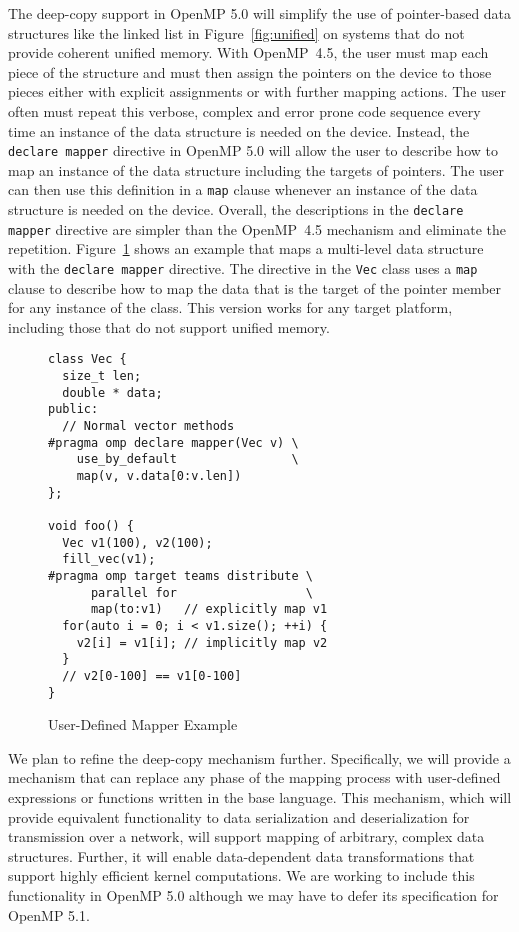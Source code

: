 The deep-copy support in OpenMP 5.0 will simplify the use of pointer-based 
data structures like the linked list in Figure~\ref{fig:unified} on systems 
that do not provide coherent unified memory. With OpenMP~4.5, the user must 
map each piece of the structure and must then assign the pointers on the 
device to those pieces either with explicit assignments or with further 
mapping actions. The user often must repeat this verbose, complex and error 
prone code sequence every time an instance of the data structure is needed 
on the device. Instead, the \texttt{declare mapper} directive in OpenMP 5.0 
will allow the user to describe how to map an instance of the data structure 
including the targets of pointers. The user can then use this definition in 
a \texttt{map} clause whenever an instance of the data structure is needed 
on the device. Overall, the descriptions in the \texttt{declare mapper} 
directive are simpler than the OpenMP~4.5 mechanism and eliminate the 
repetition. Figure~\ref{fig:mapper} shows an example that maps a multi-level 
data structure with the \texttt{declare mapper} directive.  The directive in 
the \texttt{Vec} class uses a \texttt{map} clause to describe how to map the 
data that is the target of the pointer member for any instance of the class.  
This version works for any target platform, including those that do not 
support unified memory.

\begin{figure}
\begin{verbatim}
class Vec {
  size_t len;
  double * data;
public:
  // Normal vector methods
#pragma omp declare mapper(Vec v) \
    use_by_default                \
    map(v, v.data[0:v.len])
};

void foo() {
  Vec v1(100), v2(100);
  fill_vec(v1);
#pragma omp target teams distribute \
      parallel for                  \
      map(to:v1)   // explicitly map v1
  for(auto i = 0; i < v1.size(); ++i) { 
    v2[i] = v1[i]; // implicitly map v2
  }
  // v2[0-100] == v1[0-100]
}
\end{verbatim}
\caption{User-Defined Mapper Example\label{fig:mapper}}
\end{figure}

We plan to refine the deep-copy mechanism further. Specifically, we will 
provide a mechanism that can replace any phase of the mapping process with 
user-defined expressions or functions written in the base language. This 
mechanism, which will provide equivalent functionality to data  serialization 
and deserialization for transmission over a network,  will support mapping 
of arbitrary, complex data structures. Further, it will enable data-dependent 
data transformations that support highly efficient kernel computations. We
are working to include this functionality in OpenMP 5.0 although we may
have to defer its specification for OpenMP 5.1.




